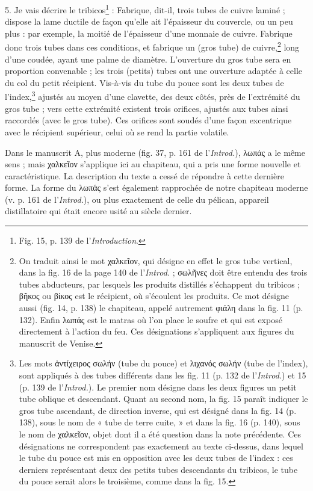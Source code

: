 \documentclass[a4paper, 11pt, oneside, polutonikogreek, french]{article}
\begin{document}
5. Je vais décrire le tribicos\footnote{Fig. 15, p. 139 de l'\emph{Introduction}.} : Fabrique, dit-il, trois tubes de cuivre laminé ; dispose la lame ductile de façon qu'elle ait l'épaisseur du couvercle, ou un peu plus : par exemple, la moitié de l'épaisseur d'une monnaie de cuivre. Fabrique donc trois tubes dans ces conditions, et fabrique un (gros tube) de cuivre,\footnote{On traduit ainsi le mot χαλκεῖον, qui désigne en effet le gros tube vertical, dans la fig. 16 de la page 140 de l'\emph{Introd.} ; σωλῆνες doit être entendu des trois tubes abducteurs, par lesquels les produits distillés s'échappent du tribicos ; βῆκος ou βίκος est le récipient, où s'écoulent les produits. Ce mot désigne aussi (fig. 14, p. 138) le chapiteau, appelé autrement φιάλη dans la fig. 11 (p. 132). Enfin λωπάς est le matras où l'on place le soufre et qui est exposé directement à l'action du feu. Ces désignations s'appliquent aux figures du manuscrit de Venise.  } long d'une coudée, ayant une palme de diamètre. L'ouverture du gros tube sera en proportion convenable ; les trois (petits) tubes ont une ouverture adaptée à celle du col du petit récipient. Vis-à-vis du tube du pouce sont les deux tubes de l'index,\footnote{Les mots ἀντίχειρος σωλήν (tube du pouce) et λιχανός σωλήν (tube de l'index), sont appliqués à des tubes différents dans les fig. 11 (p. 132 de l'\emph{Introd.}) et 15 (p. 139 de l'\emph{Introd.}). Le premier nom désigne dans les deux figures un petit tube oblique et descendant. Quant au second nom, la fig. 15 paraît indiquer le gros tube ascendant, de direction inverse, qui est désigné dans la fig. 14 (p. 138), sous le nom de « tube de terre cuite, » et dans la fig. 16 (p. 140), sous le nom de χαλκεῖον, objet dont il a été question dans la note précédente. Ces désignations ne correspondent pas exactement au texte ci-dessus, dans lequel le tube du pouce est mis en opposition avec les deux tubes de l'index : ces derniers représentant deux des petits tubes descendants du tribicos, le tube du pouce serait alors le troisième, comme dans la fig. 15.} ajustés au moyen d'une clavette, des deux côtés, près de l'extrémité du gros tube ; vers cette extrémité existent trois orifices, ajustés aux tubes ainsi raccordés (avec le gros tube). Ces orifices sont soudés d'une façon excentrique avec le récipient supérieur, celui où se rend la partie volatile.

Dans le manuscrit A, plus moderne (fig. 37, p. 161 de l'\emph{Introd.}), λωπάς a le même sens ; mais χαλκεῖον s'applique ici au chapiteau, qui a pris une forme nouvelle et caractéristique. La description du texte a cessé de répondre à cette dernière forme. La forme du λωπάς s'est également rapprochée de notre chapiteau moderne (v. p. 161 de l'\emph{Introd.}), ou plus exactement de celle du pélican, appareil distillatoire qui était encore usité au siècle dernier.
\end{document}
